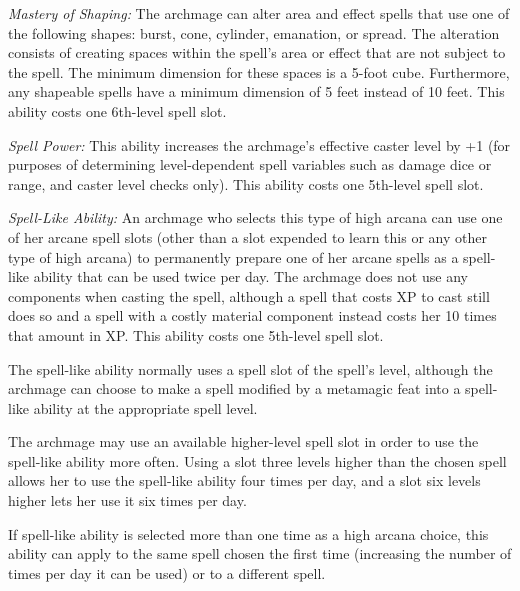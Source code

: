 \textit{Mastery of Shaping:} The archmage can alter area and effect spells that 
use one of the following shapes: burst, cone, cylinder, emanation, or spread. The 
alteration consists of creating spaces within the spell's area or effect that are 
not subject to the spell. The minimum dimension for these spaces is a 5-foot cube. 
Furthermore, any shapeable spells have a minimum dimension of 5 feet instead of 
10 feet. This ability costs one 6th-level spell slot.

\textit{Spell Power:} This ability increases the archmage's effective caster level 
by +1 (for purposes of determining level-dependent spell variables such as damage 
dice or range, and caster level checks only). This ability costs one 5th-level 
spell slot.

\textit{Spell-Like Ability:} An archmage who selects this type of high arcana can 
use one of her arcane spell slots (other than a slot expended to learn this or 
any other type of high arcana) to permanently prepare one of her arcane spells 
as a spell-like ability that can be used twice per day. The archmage does not use 
any components when casting the spell, although a spell that costs XP to cast still 
does so and a spell with a costly material component instead costs her 10 times 
that amount in XP. This ability costs one 5th-level spell slot. 

The spell-like ability normally uses a spell slot of the spell's level, although 
the archmage can choose to make a spell modified by a metamagic feat into a spell-like 
ability at the appropriate spell level. 

The archmage may use an available higher-level spell slot in order to use the spell-like 
ability more often. Using a slot three levels higher than the chosen spell allows 
her to use the spell-like ability four times per day, and a slot six levels higher 
lets her use it six times per day. 

If spell-like ability is selected more than one time as a high arcana choice, this 
ability can apply to the same spell chosen the first time (increasing the number 
of times per day it can be used) or to a different spell.
